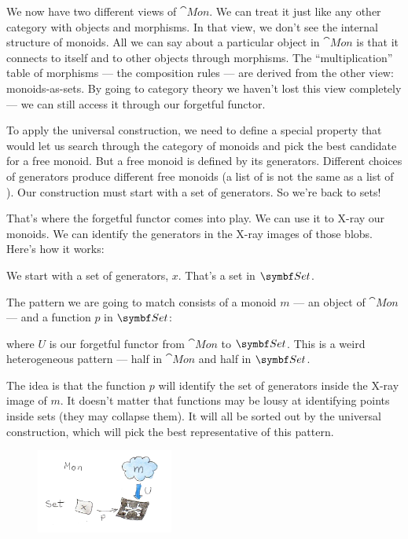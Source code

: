 We now have two different views of $\cat{Mon}$. We can treat it just
like any other category with objects and morphisms. In that view, we
don't see the internal structure of monoids. All we can say about a
particular object in $\cat{Mon}$ is that it connects to itself and to
other objects through morphisms. The ``multiplication'' table of
morphisms --- the composition rules --- are derived from the other view:
monoids-as-sets. By going to category theory we haven't lost this view
completely --- we can still access it through our forgetful functor.

To apply the universal construction, we need to define a special
property that would let us search through the category of monoids and
pick the best candidate for a free monoid. But a free monoid is defined
by its generators. Different choices of generators produce different
free monoids (a list of  is not the same as a list of
). Our construction must start with a set of generators. So
we're back to sets!

That's where the forgetful functor comes into play. We can use it to
X-ray our monoids. We can identify the generators in the X-ray images of
those blobs. Here's how it works:

We start with a set of generators, $x$. That's a set in
$\Set$.

The pattern we are going to match consists of a monoid $m$ --- an
object of $\cat{Mon}$ --- and a function $p$ in $\Set$:

where $U$ is our forgetful functor from $\cat{Mon}$ to
$\Set$. This is a weird heterogeneous pattern --- half in
$\cat{Mon}$ and half in $\Set$.

The idea is that the function $p$ will identify the set of
generators inside the X-ray image of $m$. It doesn't matter that
functions may be lousy at identifying points inside sets (they may
collapse them). It will all be sorted out by the universal construction,
which will pick the best representative of this pattern.

\begin{figure}[H]
  \centering
  \includegraphics[width=0.4\textwidth]{images/monoid-pattern.jpg}
\end{figure}


